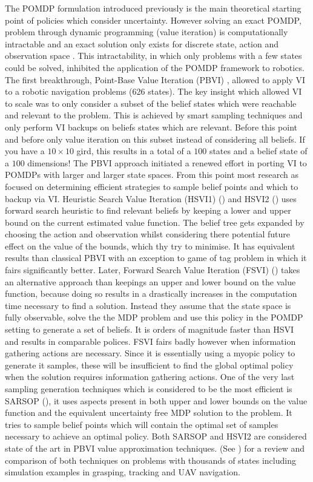 The POMDP formulation introduced previously is the main theoretical starting point of policies which
consider uncertainty. However solving an exact POMDP, problem through dynamic programming (value iteration) is 
computationally intractable and an exact solution only exists for discrete state, action and observation space \cite[Chap. 15]{Thrun_2005}.
This intractability, in which only problems with a few states could be solved, inhibited the application of the POMDP framework to robotics. 
The first breakthrough, Point-Base Value Iteration (PBVI) \cite{PBVI}, allowed to apply VI to a robotic navigation problems (626 states). The key insight 
which allowed VI to scale was to only consider a subset of the belief states which were reachable and relevant to the problem. This is achieved by smart sampling techniques
and only perform VI backups on beliefs states which are relevant. Before this point and before only value iteration on this subset instead of considering all beliefs.  If you 
have a $10 \times 10$ gird, this results in a total of a $100$ states and a belief state of a $100$ dimensions! The PBVI approach initiated a renewed effort in 
porting VI to POMDPs with larger and larger state spaces. From this point most research as focused on determining efficient strategies to sample belief points and
which to backup via VI. Heuristic Search Value Iteration (HSVI1) (\cite{HSV}) and HSVI2 (\cite{HSVI2}) uses forward search heuristic to find relevant beliefs by keeping a lower and upper 
bound on the current estimated value function. The belief tree gets expanded by choosing the action and observation whilst considering there potential future effect
on the value of the bounds, which thy try to minimise. It has equivalent results than classical PBVI with an exception to game of tag problem in which it fairs 
significantly better.  Later, Forward Search Value Iteration (FSVI) (\cite{FSVI}) takes an alternative approach than keepings an upper and lower bound on 
the value function, because doing so results in a drastically increases in the computation time necessary to find a solution. Instead they assume that the 
state space is fully observable, solve the the MDP problem and use this policy in the POMDP setting to generate a set of beliefs. It is orders of 
magnitude faster than HSVI and results in comparable polices. FSVI fairs badly however when information gathering actions are necessary. Since it is 
essentially using a myopic policy to generate it samples, these will be insufficient to find the global optimal policy when the solution requires 
information gathering actions. One of the very last sampling generation techniques which is considered to be the most efficient is SARSOP (\cite{SARSOP}),
it uses aspects present in both upper and lower bounds on the value function and the equivalent uncertainty free MDP solution to the problem. It tries
to sample belief points which will contain the optimal set of samples necessary to achieve an optimal policy.  Both SARSOP and HSVI2 are considered 
state of the art in PBVI value approximation techniques. (See \cite{POMDP_approach_2010}) for a review and comparison of both techniques on problems 
with thousands of states including simulation examples in grasping, tracking and UAV navigation. 


